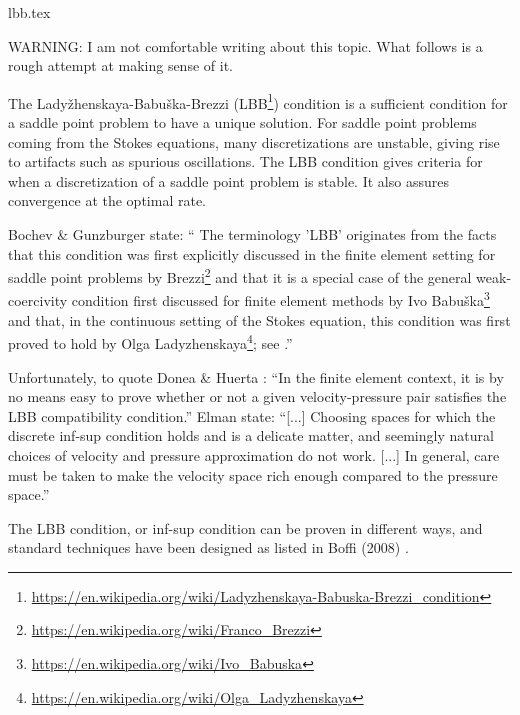 \begin{flushright} {\tiny {\color{gray} lbb.tex}} \end{flushright}

WARNING: I am not comfortable writing about this topic. What follows is a rough attempt at making sense of it.

\hspace{.4cm}

The Lady{\v z}henskaya-Babu{\v s}ka-Brezzi (LBB\footnote{
\url{https://en.wikipedia.org/wiki/Ladyzhenskaya-Babuska-Brezzi_condition}}) condition is a sufficient 
condition for a saddle point problem to have a unique solution.
For saddle point problems coming from the Stokes equations, 
many discretizations are unstable, giving rise to artifacts such as spurious oscillations. 
The LBB condition gives criteria for when a discretization of a saddle point problem is stable. 
It also assures convergence at the optimal rate. 

Bochev \& Gunzburger \cite{bogu09} state: ``
The terminology 'LBB' originates from the facts that this condition was first explicitly discussed
in the finite element setting for saddle point problems by Brezzi\footnote{
\url{https://en.wikipedia.org/wiki/Franco_Brezzi}} \cite{brez74} and that it is a special case of
the general weak-coercivity condition first discussed for finite element methods by Ivo Babu{\v s}ka\footnote{
\url{https://en.wikipedia.org/wiki/Ivo_Babuska}}
\cite{babu71} and that, in the continuous setting of the Stokes equation, this condition was first proved to
hold by Olga Ladyzhenskaya\footnote{\url{https://en.wikipedia.org/wiki/Olga_Ladyzhenskaya}}; see \cite{lady69}.''

Unfortunately, to quote Donea \& Huerta \cite{dohu03}: 
``In the finite element context, it is by no means easy to prove whether or not a given
velocity-pressure pair satisfies the LBB compatibility condition.''
Elman \etal state: ``[...] Choosing spaces for which the discrete inf-sup condition holds
and is a delicate matter, and seemingly natural choices of velocity and pressure approximation
do not work. [...] In general, care must be taken to make the velocity space 
rich enough compared to the pressure space.''

The LBB condition, or inf-sup condition can be proven in different ways, 
and standard techniques have been designed
as listed in Boffi \etal (2008) \cite{bobf08}.

